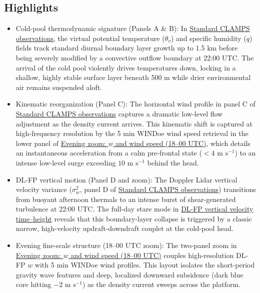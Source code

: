 \documentclass[11pt]{article}
\begin{document}
\subsection*{Highlights}
\begin{itemize}
  \item Cold-pool thermodynamic signature (Panels A \& B): In \hyperref[fig:cold_pool_c2:cold_pool_c2_instrument_template_4panel]{Standard CLAMPS observations}, the virtual potential temperature ($\theta_v$) and specific humidity ($q$) fields track standard diurnal boundary layer growth up to 1.5 km before being severely modified by a convective outflow boundary at 22:00 UTC. The arrival of the cold pool violently drives temperatures down, locking in a shallow, highly stable surface layer beneath 500 m while drier environmental air remains suspended aloft.
  \item Kinematic reorganization (Panel C): The horizontal wind profile in panel C of \hyperref[fig:cold_pool_c2:cold_pool_c2_instrument_template_4panel]{Standard CLAMPS observations} captures a dramatic low-level flow adjustment as the density current arrives. This kinematic shift is captured at high-frequency resolution by the 5 min WINDoe wind speed retrieval in the lower panel of \hyperref[fig:cold_pool_c2:cold_pool_c2_aux_zoom_w_wspd_18_00utc]{Evening zoom: $w$ and wind speed (18–00 UTC)}, which details an instantaneous acceleration from a calm pre-frontal state ($< 4\text{ m s}^{-1}$) to an intense low-level surge exceeding $10\text{ m s}^{-1}$ behind the head.
  \item DL-FP vertical motion (Panel D and zoom): The Doppler Lidar vertical velocity variance ($\sigma_w^2$, panel D of \hyperref[fig:cold_pool_c2:cold_pool_c2_instrument_template_4panel]{Standard CLAMPS observations}) transitions from buoyant afternoon thermals to an intense burst of shear-generated turbulence at 22:00 UTC. The full-day stare mode in \hyperref[fig:cold_pool_c2:cold_pool_c2_aux_dlfp_w_timeheight]{DL-FP vertical velocity time–height} reveals that this boundary-layer collapse is triggered by a classic narrow, high-velocity updraft-downdraft couplet at the cold-pool head.
  \item Evening fine-scale structure (18–00 UTC zoom): The two-panel zoom in \hyperref[fig:cold_pool_c2:cold_pool_c2_aux_zoom_w_wspd_18_00utc]{Evening zoom: $w$ and wind speed (18–00 UTC)} couples high-resolution DL-FP $w$ with 5 min WINDoe wind profiles. This layout isolates the short-period gravity wave features and deep, localized downward subsidence (dark blue core hitting $-2\text{ m s}^{-1}$) as the density current sweeps across the platform.

\end{itemize}
\end{document}
